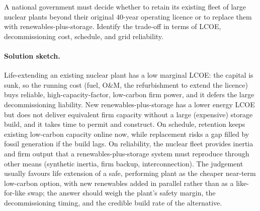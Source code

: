 \begin{exercise}
A national government must decide whether to retain its existing
fleet of large nuclear plants beyond their original $40$-year
operating licence or to replace them with renewables-plus-storage.
Identify the trade-off in terms of LCOE, decommissioning cost,
schedule, and grid reliability.
\paragraph{Solution sketch.}
Life-extending an existing nuclear plant has a low marginal LCOE: the
capital is sunk, so the running cost (fuel, O\&M, the refurbishment to
extend the licence) buys reliable, high-capacity-factor, low-carbon
firm power, and it defers the large decommissioning liability. New
renewables-plus-storage has a lower energy LCOE but does not deliver
equivalent firm capacity without a large (expensive) storage build, and
it takes time to permit and construct. On schedule, retention keeps
existing low-carbon capacity online now, while replacement risks a gap
filled by fossil generation if the build lags. On reliability, the
nuclear fleet provides inertia and firm output that a
renewables-plus-storage system must reproduce through other means
(synthetic inertia, firm backup, interconnection). The judgement
usually favours life extension of a safe, performing plant as the
cheaper near-term low-carbon option, with new renewables added in
parallel rather than as a like-for-like swap; the answer should weigh
the plant's safety margin, the decommissioning timing, and the credible
build rate of the alternative.
\end{exercise}
